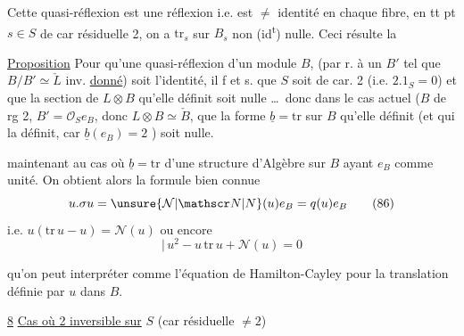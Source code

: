 
Cette quasi-réflexion est une
réflexion i.e. est $\ne$ identité en chaque fibre, 
en tt pt $s\in S$ de car résiduelle 2, on a
$\mathrm{tr}_s$ sur $B_s$ non (id\textsuperscript{t}) nulle. Ceci résulte  la

\uline{Proposition} Pour qu'une quasi-réflexion d'un
module    $B$, (par r. à un
$B'$ tel que $B/B'\simeq\check L$ inv. \uline{donné}) soit l'identité,
il f et s. que $S$ soit de car. 2 (i.e. $2.1_S=0$)
et que la  section de $L\otimes B$ qu'elle définit soit
nulle \ldots\ donc dans le cas actuel ($B$ de rg 2,
$B'=\mathcal O_S e_B$, donc $L\otimes B\simeq\check B$, que la forme $\underline b=\mathrm{tr}$
sur $B$ qu'elle définit (et qui la définit, car
$\underline b(e_B)=2$ \unsure{---|\ldots}) soit nulle.

 maintenant au cas où $\underline b=\mathrm{tr}$  
 d'une structure d'Algèbre sur $B$ ayant $e_B$ comme
unité. On obtient alors la formule bien connue
\[
u.\sigma u=\unsure{\mathcal N|\mathscr N|N}(u)e_B=q(u)e_B \tag*{(86)}
\]
i.e. \qquad $u(\mathrm{tr}\,u-u)=\mathcal N(u)$ \qquad ou encore
\[
\big|\,u^2-u\,\mathrm{tr}\,u+\mathcal N(u)=0 \tag*{(87)}
\]

qu'on peut interpréter comme l'équation de
Hamilton-Cayley pour la  translation  définie
par $u$ dans $B$.

\uline{8} \uline{Cas où 2 inversible sur} $S$ (car résiduelle $\ne2$)

